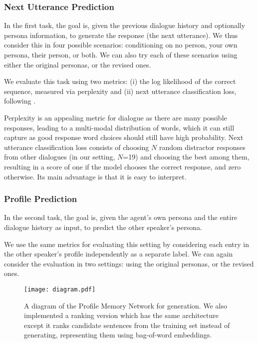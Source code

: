 \documentclass[11pt,a4paper]{article}
\begin{document}
\subsubsection{Next Utterance Prediction}

In the first task, the goal is, given the previous dialogue history and optionally persona information, to generate the response (the next utterance). We thus consider this in four possible scenarios: conditioning on no person, your own persona, their person, or both. We can also try each of these scenarios using either the original personas, or the revised ones.

We evaluate this task using two metrics: (i) the log likelihood of the correct sequence, measured via perplexity and (ii) 
next utterance classification loss, following \cite{lowe2015ubuntu}.

Perplexity is an appealing metric for dialogue as there are many possible responses, leading to a multi-modal distribution of words, which it can still capture as good response word choices should still have high probability. Next utterance classification loss consists of choosing $N$ random distractor responses from other dialogues (in our setting, $N$=19) and choosing the best among them, resulting in a score of one if the model chooses the correct response, and zero otherwise. Its main advantage is that it is easy to interpret.

\subsubsection{Profile Prediction}

In the second task, the goal is, given the agent's own persona and the entire dialogue history as input, to predict the other speaker's persona.

We use the same metrics for evaluating this setting by considering each entry in the other speaker's profile independently as a separate label. We can again consider the evaluation in two settings: using the original personas, or the revised ones. 
\fi
 \ifarxiv
\begin{figure*}[t]
	\centering
	\texttt{[image: diagram.pdf]}
    \caption{\label{fig:PMN-gen}A diagram of the Profile Memory Network for generation. We also implemented a ranking version which has the same architecture except it ranks candidate sentences from the training set instead of generating, representing them using bag-of-word embeddings.}
\end{figure*}
\fi
\end{document}
